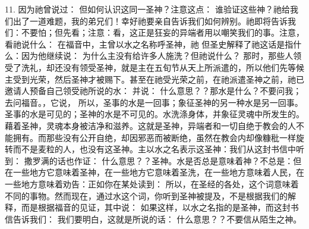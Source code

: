 11.  因为祂曾说过： 但如何认识这同一圣神？注意这点： 谁验证这些神？祂给我们出了一道难题，我的弟兄们！幸好祂要亲自告诉我们如何辨别。祂即将告诉我们：不要怕；但先看；注意：看，这正是狂妄的异端者用以嘲笑我们的事。注意，看祂说什么： 在福音中，主曾以水之名称呼圣神，祂 但圣史解释了祂这话是指什么：因为他继续说： 为什么主没有给许多人施洗？但祂说什么？ 那时，那些人领受了洗礼，却还没有领受圣神，就是主在五旬节从天上所派遣的，所以他们先等候主受到光荣，然后圣神才被赐下。甚至在祂受光荣之前，在祂派遣圣神之前，祂已邀请人预备自己领受祂所说的水： 并说： 什么意思？？那水是什么？不要问我；去问福音。，它说， 所以，圣事的水是一回事；象征圣神的另一种水是另一回事。圣事的水是可见的；圣神的水是不可见的。水洗涤身体，并象征灵魂中所发生的。藉着圣神，灵魂本身被洁净和滋养。这就是圣神，异端者和一切自绝于教会的人不能拥有。而那些没有公开自绝，却因邪恶而被断绝，虽然在教会内却像糠秕一样旋转而不是麦粒的人，也没有这圣神。主以水之名表示这圣神：我们从这封书信中听到： 撒罗满的话也作证： 什么意思？？圣神。水是否总是意味着神？不总是：但在一些地方它意味着圣神，在一些地方它意味着圣洗，在一些地方意味着人民，在一些地方意味着劝告：正如你在某处读到： 所以，在圣经的各处，这个词意味着不同的事物。然而现在，通过水这个词，你听到圣神被提及，不是根据我们的解释，而是根据福音的见证，其中说： 如果这样，以水之名指的是圣神，而这封书信告诉我们： 我们要明白，这就是所说的话： 什么意思？？不要信从陌生之神。\par

